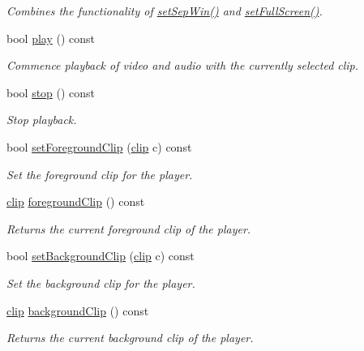 \begin{DoxyCompactItemize}
\begin{DoxyCompactList}\small\item\em Combines the functionality of \hyperlink{classlives_1_1player_ad1e1e3763f1fee6e52f990cf7bb062b9}{set\-Sep\-Win()} and \hyperlink{classlives_1_1player_a2a181f594e6c5d252088a907e8f6e7cc}{set\-Full\-Screen()}. \end{DoxyCompactList}\item 
bool \hyperlink{classlives_1_1player_a8a497a61b8fd8c08bffb6c747c8e839e}{play} () const 
\begin{DoxyCompactList}\small\item\em Commence playback of video and audio with the currently selected clip. \end{DoxyCompactList}\item 
bool \hyperlink{classlives_1_1player_a3eb5835e13f1eb5550e198de8c74cb8a}{stop} () const 
\begin{DoxyCompactList}\small\item\em Stop playback. \end{DoxyCompactList}\item 
bool \hyperlink{classlives_1_1player_afebf64a8167e16087f8328c0755f0c64}{set\-Foreground\-Clip} (\hyperlink{classlives_1_1clip}{clip} c) const 
\begin{DoxyCompactList}\small\item\em Set the foreground clip for the player. \end{DoxyCompactList}\item 
\hyperlink{classlives_1_1clip}{clip} \hyperlink{classlives_1_1player_ac365200b225c69e8cbd8e4ce7f48babb}{foreground\-Clip} () const 
\begin{DoxyCompactList}\small\item\em Returns the current foreground clip of the player. \end{DoxyCompactList}\item 
bool \hyperlink{classlives_1_1player_acbef85e26dbd27584a4f90d5b05cb360}{set\-Background\-Clip} (\hyperlink{classlives_1_1clip}{clip} c) const 
\begin{DoxyCompactList}\small\item\em Set the background clip for the player. \end{DoxyCompactList}\item 
\hyperlink{classlives_1_1clip}{clip} \hyperlink{classlives_1_1player_a1a9bacebdfc790dba3f5d54353dee462}{background\-Clip} () const 
\begin{DoxyCompactList}\small\item\em Returns the current background clip of the player. \end{DoxyCompactList}\item 

\end{DoxyCompactItemize}
